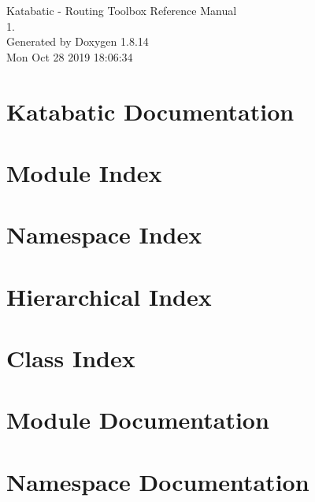 \documentclass[a4paper]{asimbook}
\begin{document}
   \begin{titlepage}
     \vspace*{7cm}
     \begin{center}
     {\Large Katabatic -\/ Routing Toolbox Reference Manual\\[1ex]\large 1. }\\
     \vspace*{1cm}
     {\large Generated by Doxygen 1.8.14}\\
     \vspace*{0.5cm}
     {\small Mon Oct 28 2019 18:06:34}\\
     \end{center}
   \end{titlepage}

   \clearemptydoublepage

   \tableofcontents
   \clearemptydoublepage

\chapter{Katabatic Documentation}
\label{index}\hypertarget{index}{}
\chapter{Module Index}

\chapter{Namespace Index}

\chapter{Hierarchical Index}

\chapter{Class Index}

\chapter{Module Documentation}


\chapter{Namespace Documentation}







\end{document}
